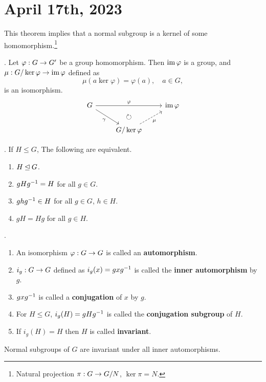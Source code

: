 \section*{April 17th, 2023}

This theorem implies that a normal subgroup is a kernel of some homomorphism.\footnote{Natural projection \(\pi : G \rightarrow G/N\), \(\ker\pi = N\).}

\thm.  Let \(\varphi : G \rightarrow G'\) be a group homomorphism. Then \(\operatorname{im} \varphi\) is a group, and \(\mu: G/\ker\varphi \rightarrow \operatorname{im} \varphi\) defined as
\[
    \mu(a \ker\varphi) = \varphi(a), \quad a \in G,
\]
is an isomorphism.
\[
    \begin{tikzcd}
        G \arrow{rr}{\varphi} \arrow[swap]{dr}{\gamma} & \arrow[d, phantom, "\circlearrowright"]& \im \varphi \\
        & G/ \ker\varphi \arrow[dashed,swap]{ur}{\mu} &
    \end{tikzcd}
\]

\thm. If \(H \leq G\), The following are equivalent.
\begin{enumerate}
    \item \(H \unlhd G\).
    \item \(gHg^{-1} = H\) for all \(g \in G\).
    \item \(ghg^{-1} \in H\) for all \(g \in G\), \(h \in H\).
    \item \(gH = Hg\) for all \(g \in H\).
\end{enumerate}

. 
\begin{enumerate}
    \item An isomorphism \(\varphi : G \rightarrow G\) is called an \textbf{automorphism}.
    \item \(i_g : G \rightarrow G\) defined as \(i_g(x) = gxg^{-1}\) is called the \textbf{inner automorphism} by \(g\).
    \item \(gxg^{-1}\) is called a \textbf{conjugation} of \(x\) by \(g\).
    \item For \(H \leq G\), \(i_g(H) = gHg^{-1}\) is called the \textbf{conjugation subgroup} of \(H\).
    \item If \(i_g(H) = H\) then \(H\) is called \textbf{invariant}.
\end{enumerate}

\rmk Normal subgroups of \(G\) are invariant under all inner automorphisms.

\pagebreak


